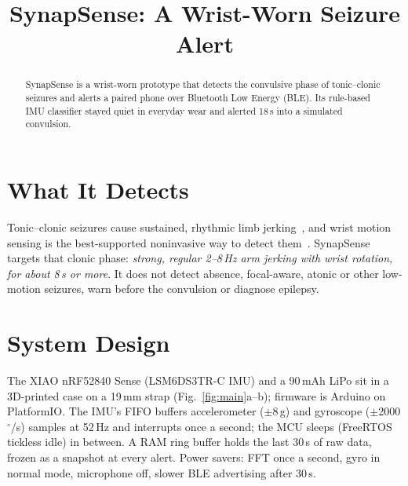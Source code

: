 \documentclass[conference,letterpaper,9pt]{IEEEtran}
\newcommand{\dps}{$^\circ$/s}
\begin{document}
\setlength{\abovedisplayskip}{3pt plus 1pt}\setlength{\belowdisplayskip}{3pt plus 1pt}

\title{SynapSense: A Wrist-Worn Seizure Alert}

\author{
}

\IEEEaftertitletext{\vspace{-1.5\baselineskip}}
\maketitle

\begin{abstract}
SynapSense is a wrist-worn prototype that detects the convulsive phase of tonic--clonic seizures and alerts a paired
phone over Bluetooth Low Energy (BLE). Its rule-based IMU classifier stayed quiet in everyday wear and alerted
18\,s into a simulated convulsion.
\end{abstract}

\section{What It Detects}
Tonic--clonic seizures cause sustained, rhythmic limb jerking~\cite{cdc,ef,ilae}, and wrist motion sensing is the
best-supported noninvasive way to detect them~\cite{aes,meta}. SynapSense targets that clonic
phase: \emph{strong, regular 2--8\,Hz arm jerking with wrist rotation, for about 8\,s or more}. It does not detect absence, focal-aware, atonic or other low-motion seizures, warn before the
convulsion or diagnose epilepsy.

\section{System Design}
The XIAO nRF52840 Sense (LSM6DS3TR-C IMU) and a 90\,mAh LiPo sit in a 3D-printed case on a 19\,mm strap
(Fig.~\ref{fig:main}a--b); firmware is Arduino on PlatformIO. The IMU's FIFO buffers accelerometer ($\pm$8\,g) and
gyroscope ($\pm$2000\,\dps) samples at 52\,Hz and interrupts once a second; the MCU sleeps (FreeRTOS tickless
idle) in between. A RAM ring buffer holds the last 30\,s of raw data, frozen as a snapshot at every alert.
Power savers: FFT once a second, gyro in normal mode, microphone off, slower BLE advertising after 30\,s.
\end{document}
